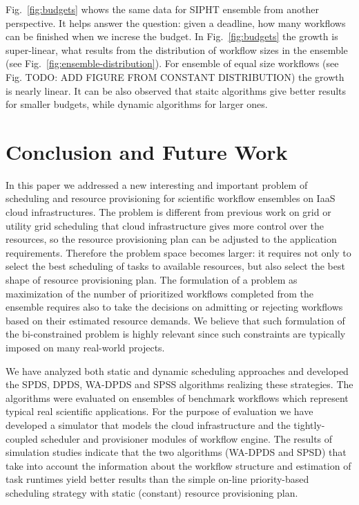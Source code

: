 \documentclass{sig-alternate}
\begin{document}
               
Fig.~\ref{fig:budgets} whows the same data for SIPHT ensemble from another
perspective. It helps answer the question: given a deadline, how many workflows
can be finished when we increse the budget. In Fig.~\ref{fig:budgets} the growth
is super-linear, what results from the distribution of workflow sizes in the
ensemble (see Fig.~\ref{fig:ensemble-distribution}). For ensemble of equal size
workflows (see Fig. TODO: ADD FIGURE FROM CONSTANT DISTRIBUTION) the growth is
nearly linear. It can be also observed that staitc algorithms give better
results for smaller budgets, while dynamic algorithms for larger ones.




\section{Conclusion and Future Work}

In this paper we addressed a new interesting and important problem of scheduling
and resource provisioning for scientific workflow ensembles on IaaS cloud
infrastructures. The problem is different from previous work on grid or utility
grid scheduling that cloud infrastructure gives more control over the resources,
so the resource provisioning plan can be adjusted to the application
requirements. Therefore the problem space becomes larger: it requires not
only to select the best scheduling of tasks to available resources, but also
select the best shape of resource provisioning plan. The formulation of a
problem as maximization of the number of prioritized workflows completed from
the ensemble requires also to take the decisions on admitting or rejecting workflows
based on their estimated resource demands. We believe that such formulation of
the bi-constrained problem is highly relevant since such
constraints are typically imposed on many real-world projects.

We have analyzed both static and dynamic scheduling approaches and
developed the SPDS, DPDS, WA-DPDS and SPSS algorithms realizing these
strategies. The algorithms were evaluated on ensembles of benchmark
workflows which represent typical real scientific applications. For the
purpose of evaluation we have developed a simulator that models the cloud
infrastructure and the tightly-coupled scheduler and provisioner modules of
workflow engine. The results of simulation studies indicate that the two algorithms (WA-DPDS and
SPSD) that take into account the information about the workflow structure and
estimation of task runtimes yield better results than the simple on-line
priority-based scheduling strategy with static (constant) resource provisioning
plan. 
\end{document}
